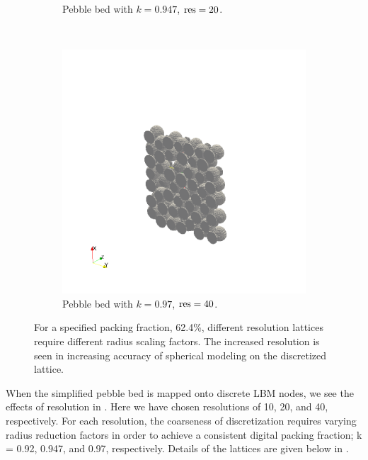 \begin{figure}[h]
\begin{subfigure}[b]{0.3\textwidth}
                \caption{Pebble bed with $k = 0.947$, $\text{res} = 20$.}
                \label{fig:k0947res20}
        \end{subfigure}%
        ~
        \begin{subfigure}[b]{0.3\textwidth}
                \includegraphics[width=\textwidth, trim={200pt, 150pt, 200pt, 200pt},clip]{figures/lbm/k097res40}
                \caption{Pebble bed with $k = 0.97$, $\text{res} = 40$.}
                \label{fig:k097res40}
        \end{subfigure}
        \caption{For a specified packing fraction, 62.4\%, different resolution lattices require different radius scaling factors. The increased resolution is seen in increasing accuracy of spherical modeling on the discretized lattice.}\label{fig:3d-dem-lbm-mapping}
\end{figure}

When the simplified pebble bed is mapped onto discrete LBM nodes, we see the effects of resolution in . Here we have chosen resolutions of 10, 20, and 40, respectively. For each resolution, the coarseness of discretization requires varying radius reduction factors in order to achieve a consistent digital packing fraction; k = 0.92, 0.947, and 0.97, respectively. Details of the lattices are given below in .


